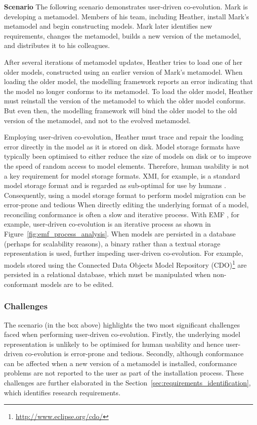 \begin{framed}
\textbf{Scenario}
The following scenario demonstrates user-driven co-evolution. Mark is developing a metamodel. Members of his team, including Heather, install Mark's metamodel and begin constructing models. Mark later identifies new requirements, changes the metamodel, builds a new version of the metamodel, and distributes it to his colleagues.

After several iterations of metamodel updates, Heather tries to load one of her older models, constructed using an earlier version of Mark's metamodel. When loading the older model, the modelling framework reports an error indicating that the model no longer conforms to its metamodel. To load the older model, Heather must reinstall the version of the metamodel to which the older model conforms. But even then, the modelling framework will bind the older model to the old version of the metamodel, and not to the evolved metamodel.

Employing user-driven co-evolution, Heather must trace and repair the loading error directly in the model as it is stored on disk. Model storage formats have typically been optimised to either reduce the size of models on disk or to improve the speed of random access to model elements. Therefore, human usability is not a key requirement for model storage formats. XMI, for example, is a standard model storage format and is regarded as sub-optimal for use by humans \cite{hutn}. Consequently, using a model storage format to perform model migration can be error-prone and tedious When directly editing the underlying format of a model, reconciling conformance is often a slow and iterative process. With EMF \cite{steinberg09emf}, for example, user-driven co-evolution is an iterative process as shown in Figure~\ref{fig:emf_process_analysis}. When models are persisted in a database (perhaps for scalability reasons), a binary rather than a textual storage representation is used, further impeding user-driven co-evolution. For example, models stored using the Connected Data Objects Model Repository (CDO)\footnote{\url{http://www.eclipse.org/cdo/}} are persisted in a relational database, which must be manipulated when non-conformant models are to be edited.
\end{framed}

\subsubsection{Challenges}
The scenario (in the box above) highlights the two most significant challenges faced when performing user-driven co-evolution. Firstly, the underlying model representation is unlikely to be optimised for human usability and hence user-driven co-evolution is error-prone and tedious. Secondly, although conformance can be affected when a new version of a metamodel is installed, conformance problems are not reported to the user as part of the installation process. These challenges are further elaborated in the Section~\ref{sec:requirements_identification}, which identifies research requirements.

